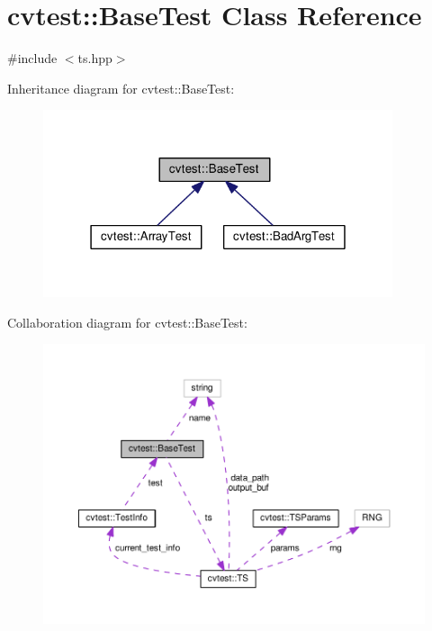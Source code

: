\hypertarget{classcvtest_1_1BaseTest}{\section{cvtest\-:\-:Base\-Test Class Reference}
\label{classcvtest_1_1BaseTest}
}


{\ttfamily \#include $<$ts.\-hpp$>$}



Inheritance diagram for cvtest\-:\-:Base\-Test\-:\nopagebreak
\begin{figure}[H]
\begin{center}
\leavevmode
\includegraphics[width=291pt]{classcvtest_1_1BaseTest__inherit__graph}
\end{center}
\end{figure}


Collaboration diagram for cvtest\-:\-:Base\-Test\-:\nopagebreak
\begin{figure}[H]
\begin{center}
\leavevmode
\includegraphics[width=350pt]{classcvtest_1_1BaseTest__coll__graph}
\end{center}
\end{figure}
